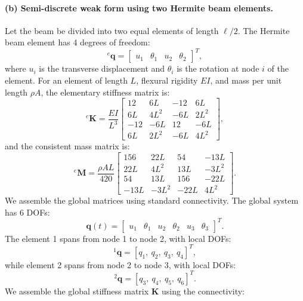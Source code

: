 \documentclass[12pt]{article}
\begin{document}
\paragraph*{(b) Semi-discrete weak form using two Hermite beam elements.} Let the beam be divided into two equal elements of length \( \ell/2 \). The Hermite beam element has 4 degrees of freedom:
\[
	{}^e\mathbf{q} = \begin{bmatrix} u_1 & \theta_1 & u_2 & \theta_2 \end{bmatrix}^T,
\]
where \( u_i \) is the transverse displacement and \( \theta_i \) is the rotation at node \( i \) of the element. For an element of length \( L \), flexural rigidity \( EI \), and mass per unit length \( \rho A \), the elementary stiffness matrix is:
\[
	{}^e\mathbf{K} = \frac{EI}{L^3} \begin{bmatrix}
		12  & 6L   & -12 & 6L   \\
		6L  & 4L^2 & -6L & 2L^2 \\
		-12 & -6L  & 12  & -6L  \\
		6L  & 2L^2 & -6L & 4L^2
	\end{bmatrix},
\]
and the consistent mass matrix is:
\[
	{}^e\mathbf{M} = \frac{\rho A L}{420} \begin{bmatrix}
		156  & 22L   & 54   & -13L  \\
		22L  & 4L^2  & 13L  & -3L^2 \\
		54   & 13L   & 156  & -22L  \\
		-13L & -3L^2 & -22L & 4L^2
	\end{bmatrix}.
\]
We assemble the global matrices using standard connectivity. The global system has 6 DOFs:
\[
	\mathbf{q}(t) = \begin{bmatrix}
		u_1 & \theta_1 & u_2 & \theta_2 & u_3 & \theta_3
	\end{bmatrix}^T.
\]
The element 1 spans from node 1 to node 2, with local DOFs:
\[
	{}^1\mathbf{q} = [q_1,\ q_2,\ q_3,\ q_4 ]^T,
\]
while element 2 spans from node 2 to node 3, with local DOFs:
\[
	{}^{2}\mathbf{q} = [q_3,\ q_4,\ q_5,\ q_6 ]^T.
\]
We assemble the global stiffness matrix \( \mathbf{K} \) using the connectivity:
\end{document}

